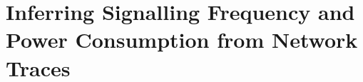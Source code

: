 \section{Inferring Signalling Frequency and Power Consumption from Network Traces}\label{sec:network:network_traces}

